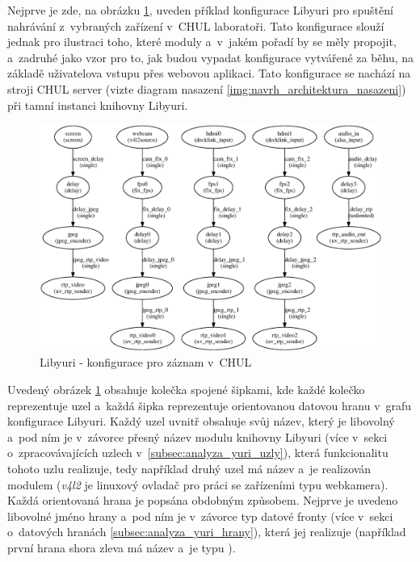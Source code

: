 \documentclass[thesis=M,czech]{FITthesis}[2012/06/26]
\begin{document}
Nejprve je zde, na obrázku \ref{img:navrh_backend_libyuri_sender}, uveden příklad konfigurace Libyuri pro spuštění nahrávání z~vybraných zařízení v~CHUL laboratoři. Tato konfigurace slouží jednak pro ilustraci toho, které moduly a~v~jakém pořadí by se měly propojit, a~zadruhé jako vzor pro to, jak budou vypadat konfigurace vytvářené za běhu, na základě uživatelova vstupu přes webovou aplikaci. Tato konfigurace se nachází na stroji CHUL server (vizte diagram nasazení \ref{img:navrh_architektura_nasazeni}) při tamní instanci knihovny Libyuri. 
\\
\begin{figure}[h]\centering
	\includegraphics[width=1\textwidth]{images/ulab_sender.eps}
	\caption{Libyuri - konfigurace pro záznam v~CHUL}\label{img:navrh_backend_libyuri_sender}
\end{figure}

Uvedený obrázek \ref{img:navrh_backend_libyuri_sender} obsahuje kolečka spojené šipkami, kde každé kolečko reprezentuje uzel a~každá šipka reprezentuje orientovanou datovou hranu v~grafu konfigurace Libyuri. Každý uzel uvnitř obsahuje svůj název, který je libovolný a~pod ním je v~závorce přesný název modulu knihovny Libyuri (více v~sekci o~zpracovávajících uzlech v~\ref{subsec:analyza_yuri_uzly}), která funkcionalitu tohoto uzlu realizuje, tedy například druhý uzel má název  a~je realizován modulem  (\textit{v4l2} je linuxový ovladač pro práci se zařízeními typu webkamera). Každá orientovaná hrana je popsána obdobným způsobem. Nejprve je uvedeno libovolné jméno hrany a~pod ním je v~závorce typ datové fronty (více v~sekci o~datových hranách \ref{subsec:analyza_yuri_hrany}), která jej realizuje (například první hrana shora zleva má název  a~je typu ).
\end{document}
